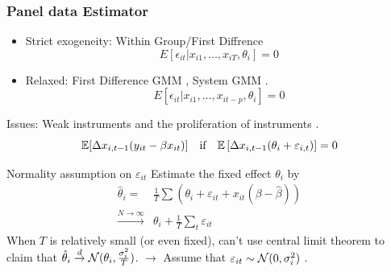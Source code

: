 \documentclass[10pt,mathserif,aspectratio=169]{beamer}
\begin{document}
\begin{frame}
  \frametitle{Panel data Estimator}
  \begin{itemize}\itemsep=12pt
    \item Strict exogeneity: Within Group/First Diffrence
          \begin{equation*}
            E[\epsilon_{it}|x_{i1},\ldots, x_{iT},\theta_i]=0
          \end{equation*}
    \item Relaxed: First Difference GMM \citep{arellano1991some}, System GMM
          \citep{arellano1995another,blundell1998initial}.
          \begin{equation*}
            E[\epsilon_{it}|x_{i1},\ldots, x_{it-p},\theta_i]=0
          \end{equation*}
  \end{itemize}

  Issues: Weak instruments \citep{blundell_bond_1998} and the proliferation of
  instruments \citep{roodman2007short}.
  \begin{equation*}
    \mathbb{E}[\Delta x_{i,t-1}(y_{it}-\beta x_{it})] \quad \text{if}\quad \mathbb{E}\left[\Delta x_{i,t-1}(\theta_i+\varepsilon_{i,t})\right]=0
  \end{equation*}
\end{frame}

\begin{frame}[label=normality]{Normality assumption on $\varepsilon_{it}$}
  Estimate the fixed effect $\theta_i$ by
  \begin{align*}
    \hat{\theta}_i =                       & \frac{1}{T}\sum(\theta_i+\varepsilon_{it}+x_{it}(\beta-\hat{\beta})) \\
    \overset{N\to \infty}{\longrightarrow} & \theta_i+\frac{1}{T}\sum_t \varepsilon_{it}
  \end{align*}
  When $T$ is relatively small (or even fixed), can't use central limit theorem to claim that $\hat{\theta}_i \overset{d}{\to} \mathcal{N}(\theta_i,\frac{\sigma_i^2}{T})$.
  $\longrightarrow$ Assume that $\varepsilon_{it} \sim \mathcal{N}(0,\sigma_i^2)$ .
  \hyperlink{observation}{}   \hyperlink{limitation}{}
\end{frame}
\end{document}
